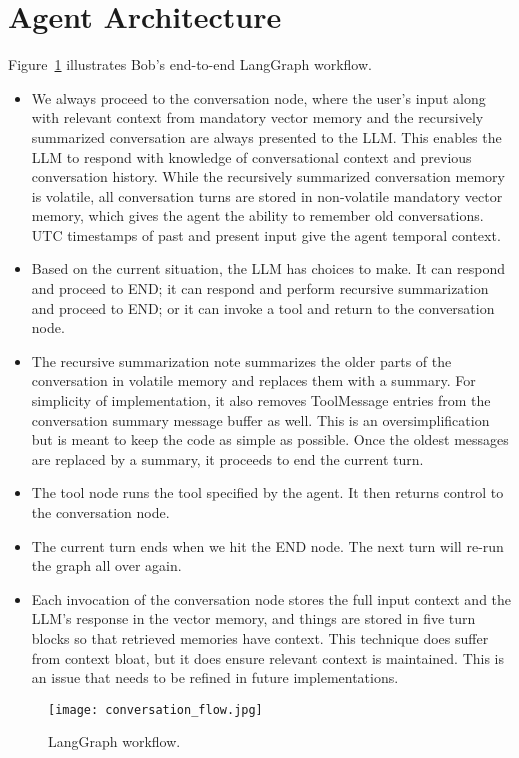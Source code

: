 \documentclass[conference]{IEEEtran}
\begin{document}
\section{Agent Architecture}
Figure~\ref{fig:workflow} illustrates Bob’s end-to-end LangGraph workflow.
\begin{itemize}[leftmargin=*]
  \item We always proceed to the conversation node, where the user's input along with relevant context from mandatory vector memory and the recursively summarized conversation are always presented to the LLM.  This enables the LLM to respond with knowledge of conversational context and previous conversation history.  While the recursively summarized conversation memory is volatile, all conversation turns are stored in non-volatile mandatory vector memory, which gives the agent the ability to remember old conversations.  UTC timestamps of past and present input give the agent temporal context.
  \item Based on the current situation, the LLM has choices to make.  It can respond and proceed to END; it can respond and perform recursive summarization and proceed to END; or it can invoke a tool and return to the conversation node.
  \item The recursive summarization note summarizes the older parts of the conversation in volatile memory and replaces them with a summary.  For simplicity of implementation, it also removes ToolMessage entries from the conversation summary message buffer as well.  This is an oversimplification but is meant to keep the code as simple as possible.  Once the oldest messages are replaced by a summary, it proceeds to end the current turn.
  \item The tool node runs the tool specified by the agent.  It then returns control to the conversation node.
  \item The current turn ends when we hit the END node.  The next turn will re-run the graph all over again.
  \item Each invocation of the conversation node stores the full input context and the LLM's response in the vector memory, and things are stored in five turn blocks so that retrieved memories have context.  This technique does suffer from context bloat, but it does ensure relevant context is maintained.  This is an issue that needs to be refined in future implementations.
\end{itemize}

\begin{figure}[H]
  \centering
  \texttt{[image: conversation\_flow.jpg]}
  \caption{LangGraph workflow.}
  \label{fig:workflow}
\end{figure}
\end{document}
